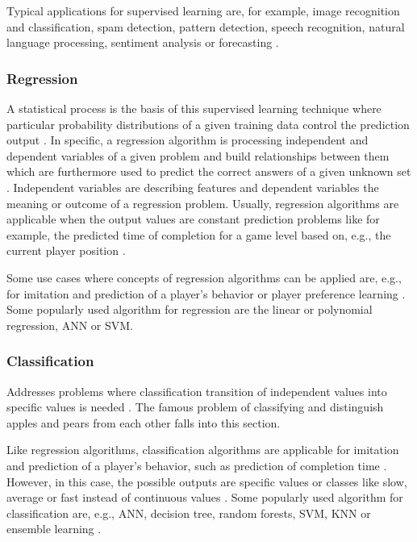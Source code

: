 \documentclass[MGS,Master,english]{twbook}%
\begin{document}
Typical applications for supervised learning are, for example, image recognition and classification, spam detection, pattern detection, speech recognition, natural language processing, sentiment analysis or forecasting \cite{ml::book::algorithms}.

\subsubsection{Regression}
A statistical process is the basis of this supervised learning technique where particular probability distributions of a given training data control the prediction output \cite{ml::book::developer}. In specific, a regression algorithm is processing independent and dependent variables of a given problem and build relationships between them which are furthermore used to predict the correct answers of a given unknown set \cite{ml::book::developer}. Independent variables are describing features and dependent variables the meaning or outcome of a regression problem. Usually, regression algorithms are applicable when the output values are constant prediction problems like for example, the predicted time of completion for a game level based on, e.g., the current player position \cite{ai::book}.

Some use cases where concepts of regression algorithms can be applied are, e.g., for imitation and prediction of a player's behavior or player preference learning \cite{ai::book}. Some popularly used algorithm for regression are the linear or polynomial regression, \ac{ANN} or \ac{SVM}. \cite{ai::book}

\subsubsection{Classification}
Addresses problems where classification transition of independent values into specific values is needed \cite{ai::book}. The famous problem of classifying and distinguish apples and pears from each other falls into this section.

Like regression algorithms, classification algorithms are applicable for imitation and prediction of a player's behavior, such as prediction of completion time \cite{ai::book}. However, in this case, the possible outputs are specific values or classes like slow, average or fast instead of continuous values \cite{ai::book}. Some popularly used algorithm for classification are, e.g., \ac{ANN}, decision tree, random forests, \ac{SVM}, \ac{KNN} or ensemble learning \cite{ai::book}.
\end{document}
